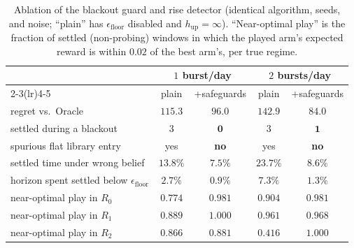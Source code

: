\documentclass[11pt]{article}
\begin{document}
\begin{table}[h]
\centering
\begin{tabular}{lcccc}
\toprule
 & \multicolumn{2}{c}{$1$ burst/day} & \multicolumn{2}{c}{$2$ bursts/day} \\
\cmidrule(lr){2-3}\cmidrule(lr){4-5}
 & plain & +safeguards & plain & +safeguards \\
\midrule
regret vs.\ Oracle          & $115.3$ & $\mathbf{96.0}$ & $142.9$ & $\mathbf{84.0}$ \\
settled during a blackout    & $3$     & $\mathbf{0}$    & $3$     & $\mathbf{1}$ \\
spurious flat library entry  & yes     & \textbf{no}     & yes     & \textbf{no} \\
settled time under wrong belief & $13.8\%$ & $\mathbf{7.5\%}$ & $23.7\%$ & $\mathbf{8.6\%}$ \\
horizon spent settled below $\epsilon_{\mathrm{floor}}$ & $2.7\%$ & $\mathbf{0.9\%}$ & $7.3\%$ & $\mathbf{1.3\%}$ \\
near-optimal play in $R_0$   & $0.774$ & $\mathbf{0.981}$ & $0.904$ & $\mathbf{0.981}$ \\
near-optimal play in $R_1$   & $0.889$ & $\mathbf{1.000}$ & $0.961$ & $\mathbf{0.968}$ \\
near-optimal play in $R_2$   & $0.866$ & $\mathbf{0.881}$ & $0.416$ & $\mathbf{1.000}$ \\
\bottomrule
\end{tabular}
\caption{Ablation of the blackout guard and rise detector (identical algorithm, seeds, and noise; ``plain'' has $\epsilon_{\mathrm{floor}}$ disabled and $h_{\mathrm{up}}=\infty$). ``Near-optimal play'' is the fraction of settled (non-probing) windows in which the played arm's expected reward is within $0.02$ of the best arm's, per true regime.}
\label{tab:ablation}
\end{table}
\end{document}
